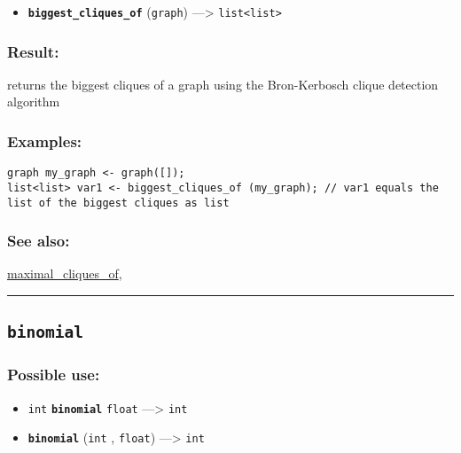 \documentclass[]{book}
\providecommand{\tightlist}{%
  \setlength{\itemsep}{0pt}\setlength{\parskip}{0pt}}
\theoremstyle{definition}
\theoremstyle{definition}
\theoremstyle{definition}
\theoremstyle{remark}
\begin{document}
\begin{itemize}
\tightlist
\item
  \textbf{\texttt{biggest\_cliques\_of}} (\texttt{graph})
  ---\textgreater{} \texttt{list\textless{}list\textgreater{}}
\end{itemize}

\subsubsection{Result:}\label{result-68}

returns the biggest cliques of a graph using the Bron-Kerbosch clique
detection algorithm

\subsubsection{Examples:}\label{examples-55}

\begin{verbatim}
graph my_graph <- graph([]);  
list<list> var1 <- biggest_cliques_of (my_graph); // var1 equals the list of the biggest cliques as list
\end{verbatim}

\subsubsection{See also:}\label{see-also-44}

\href{OperatorsIM\#maximal_cliques_of}{maximal\_cliques\_of},

\begin{center}\rule{0.5\linewidth}{\linethickness}\end{center}

\subsection{\texorpdfstring{\texttt{binomial}}{binomial}}\label{binomial}

\subsubsection{Possible use:}\label{possible-use-70}

\begin{itemize}
\tightlist
\item
  \texttt{int} \textbf{\texttt{binomial}} \texttt{float}
  ---\textgreater{} \texttt{int}
\item
  \textbf{\texttt{binomial}} (\texttt{int} , \texttt{float})
  ---\textgreater{} \texttt{int}
\end{itemize}
\end{document}
